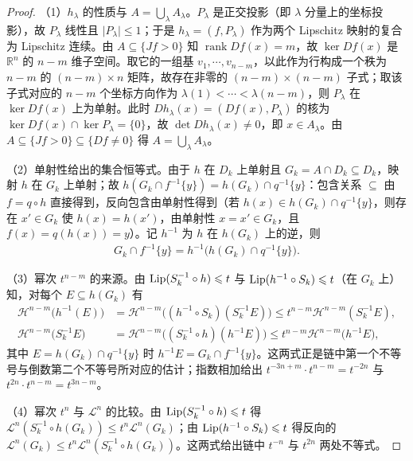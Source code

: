 \documentclass[../../main.tex]{subfiles}%
\begin{document}
\begin{proof}
（1）$h_\lambda$ 的性质与 $A=\bigcup_\lambda A_\lambda$。$P_\lambda$ 是正交投影（即 $\lambda$ 分量上的坐标投影），故 $P_\lambda$ 线性且 $\lvert P_\lambda\rvert\leqslant1$；于是 $h_\lambda=(f,P_\lambda)$ 作为两个 Lipschitz 映射的复合为 Lipschitz 连续。由 $A\subseteq\{Jf>0\}$ 知 $\operatorname{rank}Df(x)=m$，故 $\ker Df(x)$ 是 $\mathbb{R}^n$ 的 $n-m$ 维子空间。取它的一组基 $v_1,\cdots,v_{n-m}$，以此作为行构成一个秩为 $n-m$ 的 $(n-m)\times n$ 矩阵，故存在非零的 $(n-m)\times(n-m)$ 子式；取该子式对应的 $n-m$ 个坐标方向作为 $\lambda(1)<\cdots<\lambda(n-m)$，则 $P_\lambda$ 在 $\ker Df(x)$ 上为单射。此时 $Dh_\lambda(x)=(Df(x),P_\lambda)$ 的核为 $\ker Df(x)\cap\ker P_\lambda=\{0\}$，故 $\det Dh_\lambda(x)\neq0$，即 $x\in A_\lambda$。由 $A\subseteq\{Jf>0\}\subseteq\{Df\neq0\}$ 得 $A=\bigcup_\lambda A_\lambda$。

（2）单射性给出的集合恒等式。由于 $h$ 在 $D_k$ 上单射且 $G_k=A\cap D_k\subseteq D_k$，映射 $h$ 在 $G_k$ 上单射；故 $h(G_k\cap f^{-1}\{y\})=h(G_k)\cap q^{-1}\{y\}$：包含关系 $\subseteq$ 由 $f=q\circ h$ 直接得到，反向包含由单射性得到（若 $h(x)\in h(G_k)\cap q^{-1}\{y\}$，则存在 $x'\in G_k$ 使 $h(x)=h(x')$，由单射性 $x=x'\in G_k$，且 $f(x)=q(h(x))=y$）。记 $h^{-1}$ 为 $h$ 在 $h(G_k)$ 上的逆，则
\begin{align*}
G_k\cap f^{-1}\{y\}=h^{-1}\bigl(h(G_k)\cap q^{-1}\{y\}\bigr).
\end{align*}

（3）幂次 $t^{n-m}$ 的来源。由 $\operatorname{Lip}(S_k^{-1}\circ h)\leqslant t$ 与 $\operatorname{Lip}(h^{-1}\circ S_k)\leqslant t$（在 $G_k$ 上）知，对每个 $E\subseteq h(G_k)$ 有
\begin{align*}
\mathcal{H}^{n-m}\bigl(h^{-1}(E)\bigr)&=\mathcal{H}^{n-m}\bigl((h^{-1}\circ S_k)(S_k^{-1}E)\bigr)\leqslant t^{n-m}\mathcal{H}^{n-m}(S_k^{-1}E),\\
\mathcal{H}^{n-m}\bigl(S_k^{-1}E\bigr)&=\mathcal{H}^{n-m}\bigl((S_k^{-1}\circ h)(h^{-1}E)\bigr)\leqslant t^{n-m}\mathcal{H}^{n-m}\bigl(h^{-1}E\bigr),
\end{align*}
其中 $E=h(G_k)\cap q^{-1}\{y\}$ 时 $h^{-1}E=G_k\cap f^{-1}\{y\}$。这两式正是链中第一个不等号与倒数第二个不等号所对应的估计；指数相加给出 $t^{-3n+m}\cdot t^{n-m}=t^{-2n}$ 与 $t^{2n}\cdot t^{n-m}=t^{3n-m}$。

（4）幂次 $t^{n}$ 与 $\mathcal{L}^n$ 的比较。由 $\operatorname{Lip}(S_k^{-1}\circ h)\leqslant t$ 得 $\mathcal{L}^n(S_k^{-1}\circ h(G_k))\leqslant t^n\mathcal{L}^n(G_k)$；由 $\operatorname{Lip}(h^{-1}\circ S_k)\leqslant t$ 得反向的 $\mathcal{L}^n(G_k)\leqslant t^n\mathcal{L}^n(S_k^{-1}\circ h(G_k))$。这两式给出链中 $t^{-n}$ 与 $t^{2n}$ 两处不等式。


\end{proof}
\end{document}
